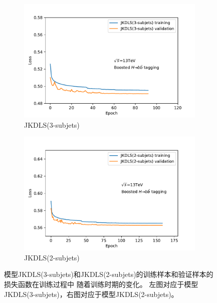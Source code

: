 \begin{figure}[htbp]
  \begin{subfigure}{.5\textwidth}
  \centering
   \includegraphics[width=0.99\textwidth]{figuresXbb/Subjet/SUB3Loss.pdf}
   \caption{JKDLS(3-subjets)}
  \end{subfigure}
  \begin{subfigure}{.5\textwidth}
  \centering
   \includegraphics[width=0.99\textwidth]{figuresXbb/Subjet/SUB2Loss.pdf}
   \caption{JKDLS(2-subjets)}
  \end{subfigure}
  \caption{ 
模型JKDLS(3-subjets)和JKDLS(2-subjets)的训练样本和验证样本的损失函数在训练过程中
随着训练时期的变化。
左图对应于模型JKDLS(3-subjets)，右图对应于模型JKDLS(2-subjets)。
   }
  \label{fig:SUBLOSS}
\end{figure} 

